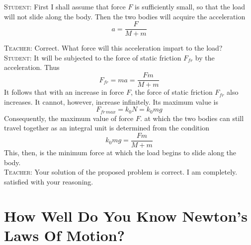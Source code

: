 \documentclass[a4paper,sfsidenotes]{tufte-book}
\begin{document}
\textsc{Student:} First I shall assume that force $F$ is sufficiently small, so that the load will not slide along the body. Then the two bodies will acquire the acceleration \\
$$
a= \frac{F}{M+m}
$$

\textsc{Teacher:} Correct. What force will this acceleration impart to the load?
\\
\textsc{Student:} It will be subjected to the force of static friction $F_{fr}$ by the acceleration. Thus
$$
F_{fr} = ma= \frac{Fm}{M+m}
$$
It follows that with an increase in force $F$, the force of static friction $F_{fr}$ also increases. It cannot, however, increase infinitely. Its maximum value is 
$$
F_{fr \, max}= k_{0}N = k_{0}mg
$$
Consequently, the maximum value of force $F$. at which the two bodies can still travel together as an integral unit is determined from the condition
$$
 k_{0}mg = \frac{Fm}{M+m}
$$
This, then, is the minimum force at which the load begins to slide along the body.
\\
\textsc{Teacher:} Your solution of the proposed problem is correct. I am completely. satisfied with your reasoning.

\chapter{How Well Do You Know Newton's Laws Of Motion?}
\label{ch-04}
\end{document}
